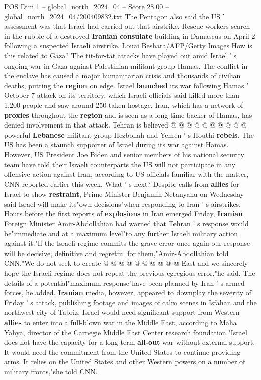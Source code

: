 \begin{textsample}{POS Dim 1 – global\_north\_2024\_04 – Score 28.00 – global\_north\_2024\_04/200409832.txt}
The Pentagon also said the US ' assessment was that Israel had carried out that airstrike.
Rescue workers search in the rubble of a destroyed \textbf{Iranian} \textbf{consulate} building in Damascus on April 2 following a suspected Israeli airstrike.
Louai Beshara/AFP/Getty Images How is this related to Gaza?
The tit-for-tat attacks have played out amid Israel ' s ongoing war in Gaza against Palestinian militant group Hamas.
The conflict in the enclave has caused a major humanitarian crisis and thousands of civilian deaths, putting the \textbf{region} on edge.
Israel \textbf{launched} its war following Hamas ' October 7 attack on its territory, which Israeli officials said killed more than 1,200 people and saw around 250 taken hostage.
Iran, which has a network of \textbf{proxies} throughout the \textbf{region} and is seen as a long-time backer of Hamas, has denied involvement in that attack.
Tehran is believed @ @ @ @ @ @ @ @ @ @ powerful \textbf{Lebanese} militant group Hezbollah and Yemen ' s Houthi \textbf{rebels}.
The US has been a staunch supporter of Israel during its war against Hamas.
However, US President Joe Biden and senior members of his national security team have told their Israeli counterparts the US will not participate in any offensive action against Iran, according to US officials familiar with the matter, CNN reported earlier this week.
What ' s next?
Despite calls from \textbf{allies} for Israel to show \textbf{restraint}, Prime Minister Benjamin Netanyahu on Wednesday said Israel will make its"own decisions"when responding to Iran ' s airstrikes.
Hours before the first reports of \textbf{explosions} in Iran emerged Friday, \textbf{Iranian} Foreign Minister Amir-Abdollahian had warned that Tehran ' s response would be"immediate and at a maximum level"to any further Israeli military action against it."If the Israeli regime commits the grave error once again our response will be decisive, definitive and regretful for them,"Amir-Abdollahian told CNN."We do not seek to create @ @ @ @ @ @ @ @ @ @ East and we sincerely hope the Israeli regime does not repeat the previous egregious error,"he said.
The details of a potential"maximum response"have been planned by Iran ' s armed forces, he added. \textbf{Iranian} media, however, appeared to downplay the severity of Friday ' s attack, publishing footage and images of calm scenes in Isfahan and the northwest city of Tabriz.
Israel would need significant support from Western \textbf{allies} to enter into a full-blown war in the Middle East, according to Maha Yahya, director of the Carnegie Middle East Center research foundation."Israel does not have the capacity for a long-term \textbf{all-out} war without external support.
It would need the commitment from the United States to continue providing arms.
It relies on the United States and other Western powers on a number of military fronts,"she told CNN.

\end{textsample}
